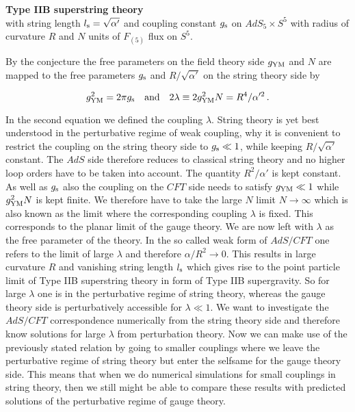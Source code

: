\begin{tcolorbox}[colback=white!95!black, colframe=white!90!black]
\begin{center}
\textbf{Type IIB superstring theory} \\
with string length $l_{\rm s}=\sqrt{\alpha'}$ and coupling constant $g_{\rm s}$ on $AdS_{5}\times S^{5}$ with radius of curvature $R$ and $N$ units of $F_{(5)}$ flux on $S^{5}$.
\end{center}
\end{tcolorbox}
%
%
\noindent By the conjecture the free parameters on the field theory side $g_{\rm YM}$ and $N$ are mapped to the free parameters $g_{\rm s}$ and $R/\sqrt{\alpha'}$ on the string theory side by
%
%
\begin{tcolorbox}[colback=white!95!black, colframe=white!90!black]
\begin{equation}
g_{\rm YM}^{2} = 2 \pi g_{\rm s} \quad {\rm and} \quad 2\lambda \equiv 2g_{\rm YM}^{2}N = R^{4}/\alpha'^{2}\,.
\end{equation}
\end{tcolorbox}
%
%
In the second equation we defined the  coupling $\lambda$. String theory is yet best understood in the perturbative regime of weak coupling, why it is convenient to restrict the coupling on the string theory side to $g_{\rm s}\ll 1$, while keeping $R/\sqrt{\alpha'}$ constant. The $AdS$ side therefore reduces to classical string theory and no higher loop orders have to be taken into account. The quantity $R^{2}/\alpha'$ is kept constant. As well as $g_{\rm s}$ also the coupling on the $CFT$ side needs to satisfy $g_{\rm YM} \ll 1$ while $g_{\rm YM}^{2}N$ is kept finite. We therefore have to take the large $N$ limit $N \to \infty$ which is also known as the  limit where the corresponding coupling $\lambda$ is fixed. This corresponds to the planar limit of the gauge theory. We are now left with $\lambda$ as the free parameter of the theory. In the so called weak form of $AdS/CFT$ one refers to the limit of large $\lambda$ and therefore $\alpha/R^{2}\to 0$. This results in large curvature $R$ and vanishing string length $l_{\rm s}$ which gives rise to the point particle limit of Type IIB superstring theory in form of Type IIB supergravity. So for large $\lambda$ one is in the perturbative regime of string theory, whereas the gauge theory side is perturbatively accessible for $\lambda \ll 1$. We want to investigate the $AdS/CFT$ correspondence numerically from the string theory side and therefore know solutions for large $\lambda$ from perturbation theory. Now we can make use of the previously stated relation by going to smaller couplings where we leave the perturbative regime of string theory but enter the selfsame for the gauge theory side. This means that when we do numerical simulations for small couplings in string theory, then we still might be able to compare these results with predicted solutions of the perturbative regime of gauge theory. 
%
%
%
%
%
%
%
%

